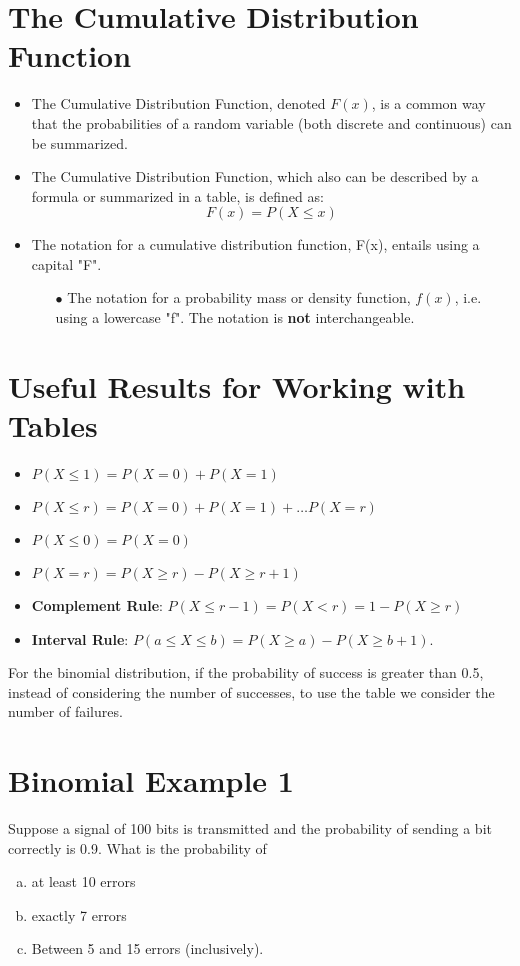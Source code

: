 \documentclass[a4paper,12pt]{article}
\begin{document}

\section*{The Cumulative Distribution Function}
\begin{itemize}
\item  The Cumulative Distribution Function, denoted $F(x)$, is a common way that the probabilities
of a random variable (both discrete and continuous) can be summarized.
\item  The Cumulative Distribution Function, which also can be
described by a formula or summarized in a table, is defined as:
\[F(x) = P(X \leq x) \]
\item  The notation for a cumulative distribution function, F(x), entails using a capital
"F".  
\begin{itemize}
\item[$\bullet$] The notation for a probability mass or density function, $f(x)$, i.e. using a lowercase "f". The notation is \textbf{not} interchangeable.
\end{itemize}
\end{itemize}

\section*{Useful Results for Working with Tables}
\begin{itemize}
\item  $P(X \leq 1) = P(X=0) + P(X=1)$
\item  $P(X \leq r) = P(X=0)+ P(X=1) + \ldots P(X= r)$
\item  $P(X \leq 0) = P(X=0)$
\item  $P(X = r) = P(X \geq r ) - P(X \geq r + 1)$
\item  \textbf{Complement Rule}: $P(X \leq r-1) = P(X < r) = 1 - P(X \geq r)$
\item  \textbf{Interval Rule}: $P(a \leq X \leq  b)= P(X \geq a) - P(X \geq b + 1).$
\end{itemize}
For the binomial distribution, if the probability of success is greater than 0.5, instead of
considering the number of successes, to use the table we consider
the number of failures.
\section*{Binomial Example 1}
Suppose a signal of 100 bits is transmitted and the probability of
sending a bit correctly is 0.9. What is the probability of
\begin{enumerate}[(a)]
\item  at least 10 errors
\item  exactly 7 errors
\item  Between 5 and 15 errors (inclusively).
\end{enumerate}
\end{document}
